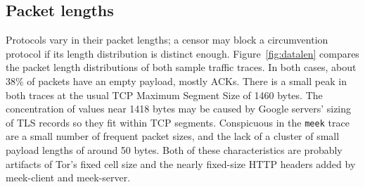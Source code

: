 \documentclass[conference]{IEEEtran}
\newcommand{\meekclient}{\mbox{meek-client}\xspace}
\newcommand{\meekserver}{\mbox{meek-server}\xspace}
\newcommand{\meek}{\texttt{meek}\xspace}
\begin{document}
\subsection{Packet lengths}

Protocols vary in their packet lengths;
a censor may block a circumvention protocol if its length distribution
is distinct enough.
Figure~\ref{fig:datalen}
compares the packet length distributions of both sample traffic traces.
In both cases, about 38\% of packets have an empty payload, mostly ACKs.
There is a small peak in both traces at the usual TCP Maximum Segment Size
of 1460 bytes.
The concentration of values near 1418 bytes
may be caused by Google servers' sizing of TLS records so they fit within TCP segments.
Conspicuous in the \meek trace are a small number of
frequent packet sizes,
and the lack of a cluster of small payload lengths of around 50 bytes.
Both of these characteristics are probably artifacts
of Tor's fixed cell size and the nearly fixed-size HTTP headers
added by \meekclient and \meekserver.

%

\end{document}
